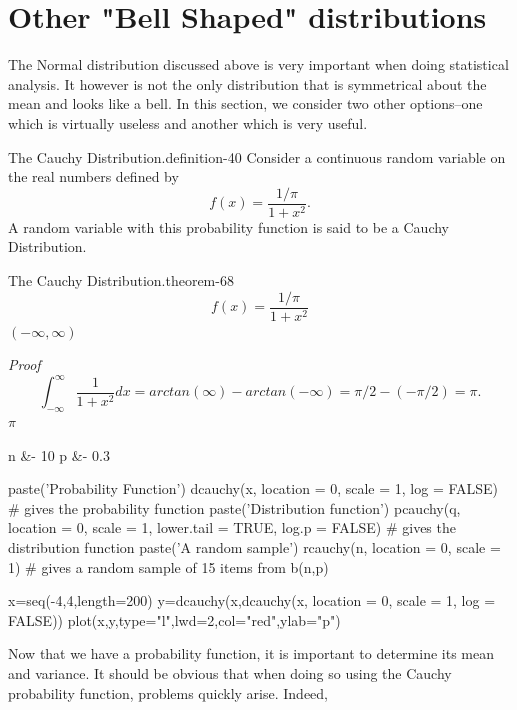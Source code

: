 \documentclass[10pt,]{book}
\makeatletter
\renewcommand*{\proofname}{Proof}
\renewenvironment{proof}[1][\proofname]{\par
  \pushQED{\qed}%
  \normalfont \topsep6\p@\@plus6\p@\relax
  \trivlist
  \item\relax
    {\itshape
    #1\@addpunct{.}}\hspace\labelsep\ignorespaces
}{%
  \popQED\endtrivlist\@endpefalse
}
\numberwithin{equation}{section}
\makeatother
\begin{document}
\section[{Other "Bell Shaped" distributions}]{Other "Bell Shaped" distributions}\label{section-60}
\hypertarget{p-1207}{}%
The Normal distribution discussed above is very important when doing statistical analysis. It however is not the only distribution that is symmetrical about the mean and looks like a bell.  In this section, we consider two other options--one which is virtually useless and another which is very useful.%
\par
\hypertarget{p-1208}{}%
\begin{definition}{The Cauchy Distribution.}{definition-40}%
\hypertarget{p-1209}{}%
Consider a continuous random variable on the real numbers defined by%
\begin{equation*}
f(x) = \frac{1/\pi}{1+x^2}.
\end{equation*}
A random variable with this probability function is said to be a Cauchy Distribution.%
\end{definition}
%
\begin{theorem}{The Cauchy Distribution.}{}{theorem-68}%
%
\begin{equation*}
f(x) = \frac{1/\pi}{1+x^2}
\end{equation*}
\((-\infty, \infty)\)\end{theorem}
\begin{proof}\hypertarget{proof-67}{}
%
\begin{equation*}
\int_{-\infty}^{\infty} \frac{1}{1+x^2} dx = arctan(\infty) - arctan(-\infty) = \pi/2 - (-\pi/2) = \pi.
\end{equation*}
\(\pi\)\end{proof}
\begin{sageinput}
n &- 10
p &- 0.3

paste('Probability Function')
dcauchy(x, location = 0, scale = 1, log = FALSE)   # gives the probability function
paste('Distribution function')
pcauchy(q, location = 0, scale = 1, lower.tail = TRUE, log.p = FALSE)
   # gives the distribution function
paste('A random sample')
rcauchy(n, location = 0, scale = 1)    # gives a random sample of 15 items from b(n,p)

x=seq(-4,4,length=200)
y=dcauchy(x,dcauchy(x, location = 0, scale = 1, log = FALSE))
plot(x,y,type="l",lwd=2,col="red",ylab="p")
\end{sageinput}
\hypertarget{p-1210}{}%
Now that we have a probability function, it is important to determine its mean and variance. It should be obvious that when doing so using the Cauchy probability function, problems quickly arise.  Indeed,%
\end{document}

